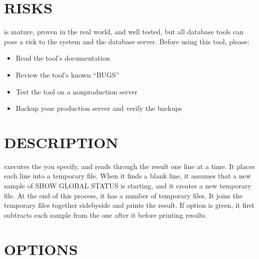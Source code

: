 \documentclass[letterpaper,10pt,english]{sphinxmanual}
\begin{document}
\section{RISKS}
\label{\detokenize{mariadb-status-diff:risks}}
 is mature, proven in the real world, and well tested,
but all database tools can pose a risk to the system and the database
server.  Before using this tool, please:
\begin{itemize}
\item {} 
Read the tool’s documentation

\item {} 
Review the tool’s known “BUGS”

\item {} 
Test the tool on a non\sphinxhyphen{}production server

\item {} 
Backup your production server and verify the backups

\end{itemize}


\section{DESCRIPTION}
\label{\detokenize{mariadb-status-diff:description}}
 executes the  you specify, and reads through the result one
line at a time.  It places each line into a temporary file.  When it finds a
blank line, it assumes that a new sample of SHOW GLOBAL STATUS is starting,
and it creates a new temporary file.  At the end of this process, it has a
number of temporary files.  It joins the temporary files together side\sphinxhyphen{}by\sphinxhyphen{}side
and prints the result.  If {\hyperref[\detokenize{mariadb-status-diff:cmdoption-mariadb-status-diff-relative}]{}} option is given, it first subtracts
each sample from the one after it before printing results.


\section{OPTIONS}
\label{\detokenize{mariadb-status-diff:options}}
\end{document}
